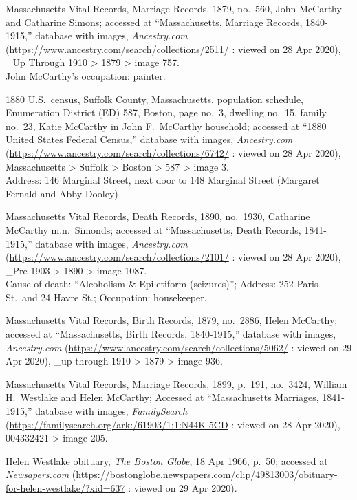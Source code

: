 \begin{thebibliography}{999}
	Massachusetts Vital Records, Marriage Records, 1879, no.\ 560, John McCarthy and Catharine Simons; accessed at ``Massachusetts, Marriage Records, 1840-1915,'' database with images, \textit{Ancestry.com} (\url{https://www.ancestry.com/search/collections/2511/} : viewed on 28 Apr 2020), \_Up Through 1910 > 1879 > image 757.\\
	John McCarthy's occupation: painter.
	
	1880 U.S.\ census, Suffolk County, Massachusetts, population schedule, Enumeration District (ED) 587, Boston, page no.\ 3, dwelling no.\ 15, family no.\ 23, Katie McCarthy in John F.\ McCarthy household; accessed at ``1880 United States Federal Census,'' database with images, \textit{Ancestry.com} (\url{https://www.ancestry.com/search/collections/6742/} : viewed on 28 Apr 2020), Massachusetts > Suffolk > Boston > 587 > image 3.\\
	Address: 146 Marginal Street, next door to 148 Marginal Street (Margaret Fernald and Abby Dooley)
	
	Massachusetts Vital Records, Death Records, 1890, no.\ 1930, Catharine McCarthy m.n.\ Simonds; accessed at ``Massachusetts, Death Records, 1841-1915,'' database with images, \textit{Ancestry.com} (\url{https://www.ancestry.com/search/collections/2101/} : viewed on 28 Apr 2020), \_Pre 1903 > 1890 > image 1087.\\
	Cause of death: ``Alcoholism \& Epiletiform (seizures)''; Address: 252 Paris St.\ and 24 Havre St.; Occupation: housekeeper.
	
	Massachusetts Vital Records, Birth Records, 1879, no.\ 2886, Helen McCarthy; accessed at ``Massachusetts, Birth Records, 1840-1915,'' database with images, \textit{Ancestry.com} (\url{https://www.ancestry.com/search/collections/5062/} : viewed on 29 Apr 2020), \_up through 1910 > 1879 > image 936.
	
	Massachusetts Vital Records, Marriage Records, 1899, p.\ 191, no.\ 3424, William H.\ Westlake and Helen McCarthy; Accessed at ``Massachusetts Marriages, 1841-1915,'' database with images, \textit{FamilySearch} (\url{https://familysearch.org/ark:/61903/1:1:N44K-5CD} : viewed on 28 Apr 2020), 004332421 > image 205.
	
	Helen Westlake obituary, \textit{The Boston Globe}, 18 Apr 1966, p.\ 50; accessed at \textit{Newsapers.com} (\url{https://bostonglobe.newspapers.com/clip/49813003/obituary-for-helen-westlake/?xid=637} : viewed on 29 Apr 2020).
	

\end{thebibliography}
